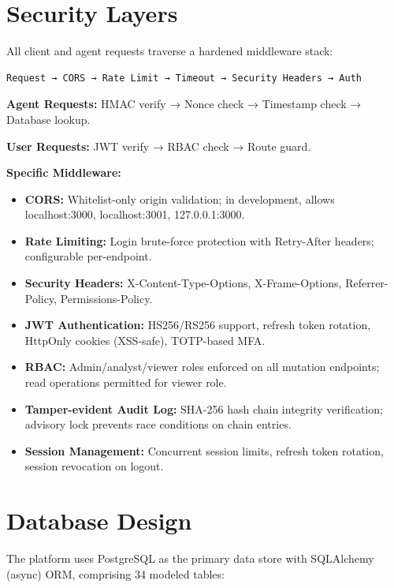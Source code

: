 \section{Security Layers}

All client and agent requests traverse a hardened middleware stack:

\begin{verbatim}
Request → CORS → Rate Limit → Timeout → Security Headers → Auth
\end{verbatim}

\noindent\textbf{Agent Requests:} HMAC verify → Nonce check → Timestamp check → Database lookup.

\noindent\textbf{User Requests:} JWT verify → RBAC check → Route guard.

\noindent\textbf{Specific Middleware:}

\begin{itemize}
    \item \textbf{CORS:} Whitelist-only origin validation; in development, allows localhost:3000, localhost:3001, 127.0.0.1:3000.
    \item \textbf{Rate Limiting:} Login brute-force protection with Retry-After headers; configurable per-endpoint.
    \item \textbf{Security Headers:} X-Content-Type-Options, X-Frame-Options, Referrer-Policy, Permissions-Policy.
    \item \textbf{JWT Authentication:} HS256/RS256 support, refresh token rotation, HttpOnly cookies (XSS-safe), TOTP-based MFA.
    \item \textbf{RBAC:} Admin/analyst/viewer roles enforced on all mutation endpoints; read operations permitted for viewer role.
    \item \textbf{Tamper-evident Audit Log:} SHA-256 hash chain integrity verification; advisory lock prevents race conditions on chain entries.
    \item \textbf{Session Management:} Concurrent session limits, refresh token rotation, session revocation on logout.
\end{itemize}

\section{Database Design}

The platform uses PostgreSQL as the primary data store with SQLAlchemy (async) ORM, comprising 34 modeled tables:

